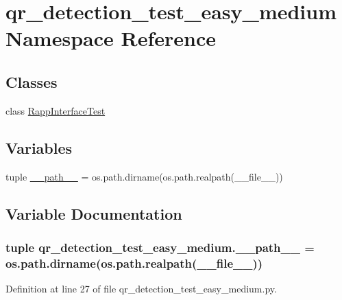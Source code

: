 \hypertarget{namespaceqr__detection__test__easy__medium}{\section{qr\-\_\-detection\-\_\-test\-\_\-easy\-\_\-medium Namespace Reference}
\label{namespaceqr__detection__test__easy__medium}
}
\subsection*{Classes}
\begin{DoxyCompactItemize}
\item 
class \hyperlink{classqr__detection__test__easy__medium_1_1RappInterfaceTest}{Rapp\-Interface\-Test}
\end{DoxyCompactItemize}
\subsection*{Variables}
\begin{DoxyCompactItemize}
\item 
tuple \hyperlink{namespaceqr__detection__test__easy__medium_a19e5d214d625cc0f9f0e0b58f4be9fd6}{\-\_\-\-\_\-path\-\_\-\-\_\-} = os.\-path.\-dirname(os.\-path.\-realpath(\-\_\-\-\_\-file\-\_\-\-\_\-))
\end{DoxyCompactItemize}


\subsection{Variable Documentation}
\hypertarget{namespaceqr__detection__test__easy__medium_a19e5d214d625cc0f9f0e0b58f4be9fd6}{
\subsubsection[{\-\_\-\-\_\-path\-\_\-\-\_\-}]{\setlength{\rightskip}{0pt plus 5cm}tuple qr\-\_\-detection\-\_\-test\-\_\-easy\-\_\-medium.\-\_\-\-\_\-path\-\_\-\-\_\- = os.\-path.\-dirname(os.\-path.\-realpath(\-\_\-\-\_\-file\-\_\-\-\_\-))}}\label{namespaceqr__detection__test__easy__medium_a19e5d214d625cc0f9f0e0b58f4be9fd6}


Definition at line 27 of file qr\-\_\-detection\-\_\-test\-\_\-easy\-\_\-medium.\-py.


